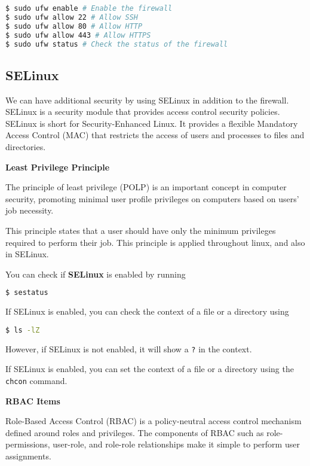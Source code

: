 \begin{lstlisting}[language=bash]
$ sudo ufw enable # Enable the firewall
$ sudo ufw allow 22 # Allow SSH
$ sudo ufw allow 80 # Allow HTTP
$ sudo ufw allow 443 # Allow HTTPS
$ sudo ufw status # Check the status of the firewall
\end{lstlisting}

\subsection{SELinux}

We can have additional security by using SELinux
in addition to the firewall. SELinux is a security
module that provides access control security policies.
SELinux is short for Security-Enhanced Linux.
It provides a flexible Mandatory Access Control (MAC)
that restricts the access of users and processes to
files and directories.

\textbf{Least Privilege Principle}

\begin{definition}
The principle of least privilege (POLP) is an important
concept in computer security, promoting minimal user
profile privileges on computers based on users' job
necessity.
\end{definition}

This principle states that a user should have only
the minimum privileges required to perform their job.
This principle is applied throughout linux, and also
in SELinux.

You can check if \textbf{SELinux} is enabled by running

\begin{lstlisting}[language=bash]
$ sestatus
\end{lstlisting}

If SELinux is enabled, you can check the context of
a file or a directory using

\begin{lstlisting}[language=bash]
$ ls -lZ
\end{lstlisting}

However, if SELinux is not enabled, it will show
a \texttt{?} in the context.

If SELinux is enabled, you can set the context of a
file or a directory using the \texttt{chcon} command.

\textbf{RBAC Items}

\begin{definition}
Role-Based Access Control (RBAC) is a policy-neutral
access control mechanism defined around roles and
privileges. The components of RBAC such as role-permissions,
user-role, and role-role relationships make it simple
to perform user assignments.
\end{definition}

